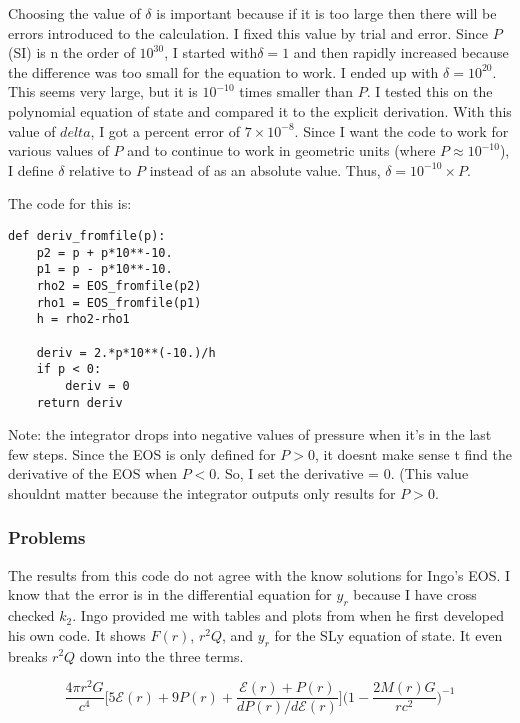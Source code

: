 \documentclass[11pt]{article}
\numberwithin{equation}{section}
\begin{document}
Choosing the value of $\delta$ is important because if it is too large then there will be errors introduced to the calculation.  I fixed this value by trial and error.  Since $P$ (SI) is n the order of $10^{30}$,  I started with$\delta = 1$ and then rapidly increased because the difference was too small for the equation to work.  I ended up with $\delta = 10^{20}$.  This seems very large, but it is $10^{-10}$ times smaller than $P$.  I  tested this on the polynomial equation of state and compared it to the explicit derivation.  With this value of $delta$, I got a percent error of $7 \times 10^{-8}$.   Since I want the code to work for various values of $P$ and to continue to work in geometric units (where $P \approx  10^{-10}$), I define $\delta$ relative to $P$ instead of as an absolute value.  Thus, $\delta = 10^{-10} \times P$.

The code for this is:

\begin{lstlisting}
def deriv_fromfile(p):
    p2 = p + p*10**-10. 
    p1 = p - p*10**-10. 
    rho2 = EOS_fromfile(p2)
    rho1 = EOS_fromfile(p1)
    h = rho2-rho1

    deriv = 2.*p*10**(-10.)/h
    if p < 0:
        deriv = 0
    return deriv
\end{lstlisting}

Note: the integrator drops into negative values of pressure when it's in the last few steps.  Since the EOS is only defined for $P>0$, it doesnt make sense t find the derivative of the EOS when $P<0$.  So, I set the derivative = 0.  (This value shouldnt matter because the integrator outputs only results for $P>0$.

\subsubsection{Problems}

The results from this code do not agree with the know solutions for Ingo's EOS.  I know that the error is in the differential equation for $y_r$ because I have cross checked $k_2$.  Ingo provided me with tables and plots from when he first developed his own code.  It shows $F(r)$, $r^{2} Q$, and $y_r$ for the SLy equation of state.  It even breaks $r^2Q$ down into the three terms.  

\begin{equation}
\frac{4 \pi r^{2} G}{c^{4}} \bigg[ 5 \mathcal{E}(r) + 9 P(r) + \frac{\mathcal{E}(r) + P(r)}{dP(r)/d\mathcal{E}(r)}   \bigg] \bigg(  1 - \frac{2 M(r) G}{r c^{2}} \bigg) ^{-1} 
\end{equation}
\end{document}
